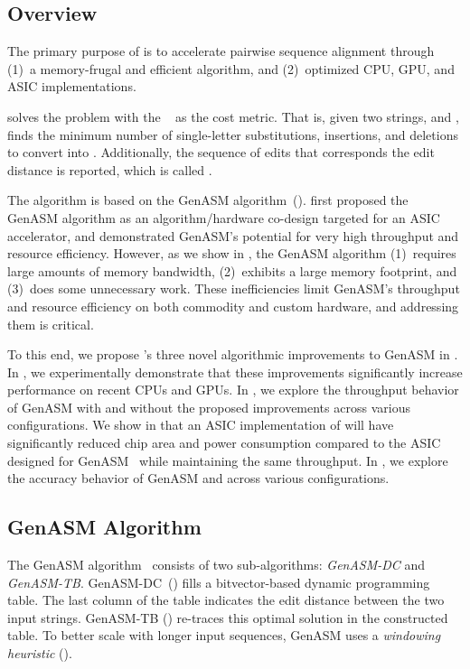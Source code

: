 \subsection{Overview} \label{sec:overview}
The primary purpose of \toolname is to accelerate pairwise sequence alignment through (1)~a memory-frugal and efficient algorithm, and (2)~optimized CPU, GPU, and ASIC implementations.

\toolname solves the  problem with the ~\citep{levenshtein1966binary} as the cost metric. That is, given two strings,  and , \toolname finds the minimum number of single-letter substitutions, insertions, and deletions to convert  into . Additionally, the sequence of edits that corresponds the edit distance is reported, which is called .

The \toolname algorithm is based on the GenASM algorithm~().
\citep{cali2020genasm} first proposed the GenASM algorithm as an algorithm/hardware co-design targeted for an ASIC accelerator, and demonstrated GenASM's potential for very high throughput and resource efficiency. However, as we show in , the GenASM algorithm (1)~requires large amounts of memory bandwidth, (2)~exhibits a large memory footprint, and (3)~does some unnecessary work. These inefficiencies limit GenASM's throughput and resource efficiency on both commodity and custom hardware, and addressing them is critical.

To this end, we propose \toolname's three novel algorithmic improvements to GenASM in . 
In , we experimentally demonstrate that these improvements significantly increase performance on recent CPUs and GPUs. In , we explore the throughput behavior of GenASM with and without the proposed improvements across various configurations. We show in  that an ASIC implementation of \toolname will have significantly reduced chip area and power consumption compared to the ASIC designed for GenASM~\citep{cali2020genasm} while maintaining the same throughput. In , we explore the accuracy behavior of GenASM and \toolname across various configurations.

\subsection{GenASM Algorithm} \label{sec:genasm_algo}
The GenASM algorithm~\citep{cali2020genasm} consists of two sub-algorithms: \emph{GenASM-DC} and \emph{GenASM-TB}. GenASM-DC~() fills a bitvector-based dynamic programming table. The last column of the table indicates the edit distance between the two input strings. GenASM-TB () re-traces this optimal solution in the constructed table. To better scale with longer input sequences, GenASM uses a \emph{windowing heuristic} ().

